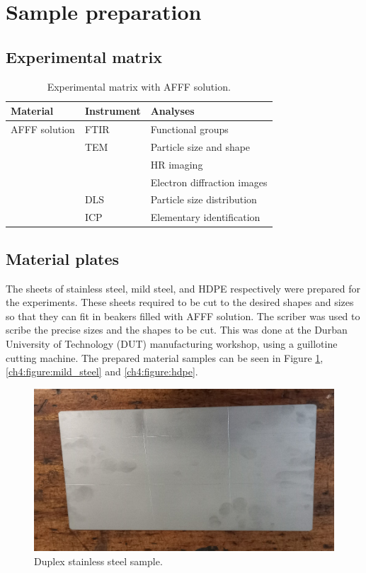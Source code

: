 \documentclass[12pt]{report}
\begin{document}
\section{Sample preparation}
\subsection{Experimental matrix}

\begin{table}[H]

\centering
\begin{tabular}{m{} m{} m{}}
    \hline
    Material & Instrument & Analyses \\
    \hline
    AFFF solution & FTIR & Functional groups \\
    & TEM & Particle size and shape \\
    & & HR imaging \\
    & & Electron diffraction images \\
    & DLS & Particle size distribution \\
    & ICP & Elementary identification \\
    \hline
\end{tabular}

\caption{Experimental matrix with AFFF solution.}
\end{table}

\subsection{Material plates} 
The sheets of stainless steel, mild steel, and HDPE respectively were prepared for the experiments. These sheets required to be cut to the desired shapes and sizes so that they can fit in beakers filled with AFFF solution. The scriber was used to scribe the precise sizes and the shapes to be cut. This was done at the Durban University of Technology (DUT) manufacturing workshop, using a guillotine cutting machine. The prepared material samples can be seen in Figure \ref{ch4:figure:stainless_steel}, \ref{ch4:figure:mild_steel} and \ref{ch4:figure:hdpe}.
 
\begin{figure}[H]
    \centering
    \includegraphics[width=.55\textwidth]{duplex_stainless_steel_sample.jpg}
    \caption{Duplex stainless steel sample.}
    \label{ch4:figure:stainless_steel}
\end{figure}
 
\end{document}
